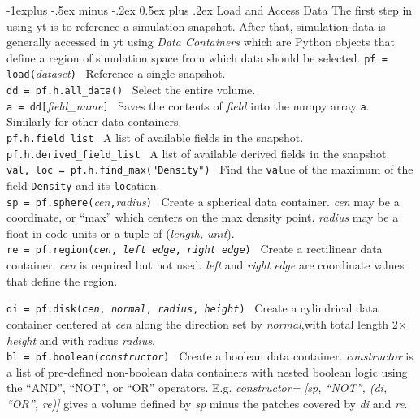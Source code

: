\documentclass[10pt,landscape]{article}
\makeatletter
\renewcommand{\subsection}{\@startsection{subsection}{2}{0mm}%
                                {-1explus -.5ex minus -.2ex}%
                                {0.5ex plus .2ex}%
                                {\normalfont\normalsize\bfseries}}
\makeatother
\begin{document}
\begin{multicols}{3}
\subsection{Load and Access Data}
The first step in using yt is to reference a simulation snapshot.
After that, simulation data is generally accessed in yt using {\it Data Containers} which are Python objects
that define a region of simulation space from which data should be selected.
\texttt{pf = load(}{\it dataset}\texttt{)} \textemdash\   Reference a single snapshot.\\
\texttt{dd = pf.h.all\_data()} \textemdash\ Select the entire volume.\\
\texttt{a = dd[}{\it field\_name}\texttt{]} \textemdash\ Saves the contents of {\it field} into the
numpy array \texttt{a}. Similarly for other data containers.\\
\texttt{pf.h.field\_list} \textemdash\ A list of available fields in the snapshot. \\
\texttt{pf.h.derived\_field\_list} \textemdash\ A list of available derived fields
in the snapshot. \\
\texttt{val, loc = pf.h.find\_max("Density")} \textemdash\ Find the \texttt{val}ue of
the maximum of the field \texttt{Density} and its \texttt{loc}ation. \\
\texttt{sp = pf.sphere(}{\it cen}\texttt{,}{\it radius}\texttt{)} \textemdash\   Create a spherical data 
container. {\it cen} may be a coordinate, or ``max'' which 
centers on the max density point. {\it radius} may be a float in 
code units or a tuple of ({\it length, unit}).\\

\texttt{re = pf.region({\it cen}, {\it left edge}, {\it right edge})} \textemdash\ Create a
rectilinear data container. {\it cen} is required but not used.
{\it left} and {\it right edge} are coordinate values that define the region.

\texttt{di = pf.disk({\it cen}, {\it normal}, {\it radius}, {\it height})} \textemdash\ 
Create a cylindrical data container centered at {\it cen} along the 
direction set by {\it normal},with total length
 2$\times${\it height} and with radius {\it radius}. \\
 
 \texttt{bl = pf.boolean({\it constructor})} \textemdash\ Create a boolean data
 container. {\it constructor} is a list of pre-defined non-boolean 
 data containers with nested boolean logic using the
 ``AND'', ``NOT'', or ``OR'' operators. E.g. {\it constructor=}
 {\it [sp, ``NOT'', (di, ``OR'', re)]} gives a volume defined
 by {\it sp} minus the patches covered by {\it di} and {\it re}.\\
 

\end{multicols}
\end{document}
